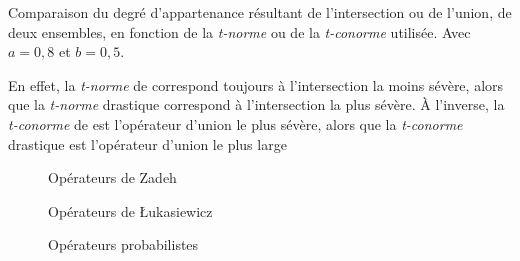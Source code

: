 \begin{table}
  \centering
  
  \caption{Comparaison du degré d'appartenance résultant de
    l'intersection ou de l'union, de deux ensembles, en fonction de la
    \emph{t-norme} ou de la \emph{t-conorme} utilisée. Avec
    \(a = 0,8\) et \(b = 0,5\).}
  \label{tab:conf_tnormes}
\end{table}

En effet, la \emph{t-norme} de \textcite{Zadeh1965} correspond
toujours à l'intersection la moins sévère, alors que la \emph{t-norme}
drastique correspond à l'intersection la plus sévère. À l'inverse, la
\emph{t-conorme} de  \textcite{Zadeh1965} est l'opérateur d'union le
plus sévère, alors que la \emph{t-conorme} drastique est l'opérateur
d'union le plus large \autocite{Bouchon-Meunier2007}

\begin{figure}
  \begin{center}
    \caption{Opérateurs de Zadeh}
    \label{fig:zadeh_op}
  \end{center}
\end{figure}

\begin{figure}
  \begin{center}
    \caption{Opérateurs de Łukasiewicz}
    \label{fig:luka_op}
  \end{center}
\end{figure}

\begin{figure}
  \begin{center}
    \caption{Opérateurs probabilistes}
    \label{fig:prob_op}
  \end{center}
\end{figure}


